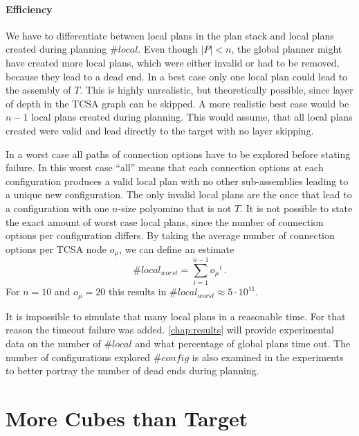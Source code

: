 \paragraph{Efficiency}

We have to differentiate between local plans in the plan stack and local plans created during planning $\#local$.
Even though $|P| < n$, the global planner might have created more local plans, which were either invalid or had to be removed, because they lead to a dead end.
In a best case only one local plan could lead to the assembly of $T$.
This is highly unrealistic, but theoretically possible, since layer of depth in the TCSA graph can be skipped.
A more realistic best case would be $n-1$ local plans created during planning. 
This would assume, that all local plans created were valid and lead directly to the target with no layer skipping.

In a worst case all paths of connection options have to be explored before stating failure.
In this worst case ``all'' means that each connection options at each configuration produces a valid local plan with no other sub-assemblies leading to a unique new configuration.
The only invalid local plans are the once that lead to a configuration with one $n$-size polyomino that is not $T$.
It is not possible to state the exact amount of worst case local plans, since the number of connection options per configuration differs.
By taking the average number of connection options per TCSA node $o_\mu$, we can define an estimate
\begin{equation}
\#local_{worst} = \sum_{i=1}^{n-1} {o_\mu}^i \, .
\end{equation} 
For $n = 10$ and $o_\mu = 20$ this results in $\#local_{worst} \approx 5 \cdot 10^{11}$.

It is impossible to simulate that many local plans in a reasonable time.
For that reason the timeout failure was added.
\autoref{chap:results} will provide experimental data on the number of $\#local$ and what percentage of global plans time out.
The number of configurations explored $\#config$ is also examined in the experiments to better portray the number of dead ends during planning.






\section{More Cubes than Target}
\label{sec:more_cubes}

